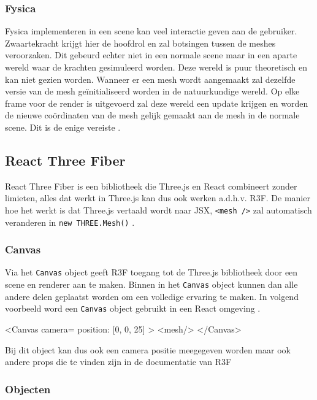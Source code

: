 \subsubsection{Fysica}

Fysica implementeren in een scene kan veel interactie geven aan de gebruiker. Zwaartekracht krijgt hier de hoofdrol en zal botsingen tussen de meshes veroorzaken. Dit gebeurd echter niet in een normale scene maar in een aparte wereld waar de krachten gesimuleerd worden. Deze wereld is puur theoretisch en kan niet gezien worden. Wanneer er een mesh wordt aangemaakt zal dezelfde versie van de mesh geïnitialiseerd worden in de natuurkundige wereld.
Op elke frame voor de render is uitgevoerd zal deze wereld een update krijgen en worden de nieuwe coördinaten van de mesh gelijk gemaakt aan de mesh in de normale scene. Dit is de enige vereiste \autocite{Simon2023}.

\subsection{React Three Fiber}

React Three Fiber is een bibliotheek die Three.js en React combineert zonder limieten, alles dat werkt in Three.js kan dus ook werken a.d.h.v. R3F. De manier hoe het werkt is dat Three.js vertaald wordt naar JSX, \texttt{<mesh />} zal automatisch veranderen in \texttt{new THREE.Mesh()} \autocite{reactThreeFiber2023}.

\subsubsection{Canvas}

Via het \texttt{Canvas} object geeft R3F toegang tot de Three.js bibliotheek door een scene en renderer aan te maken. Binnen in het  \texttt{Canvas} object kunnen dan alle andere delen geplaatst worden om een volledige ervaring te maken. In volgend voorbeeld word een  \texttt{Canvas} object gebruikt in een React omgeving \autocite{reactThreeFiber2023}.

\begin{LVerbatim}
<Canvas camera={{ position: [0, 0, 25] }} >
	<mesh/>
</Canvas>
\end{LVerbatim}

Bij dit object kan dus ook een camera positie meegegeven worden maar ook andere props die te vinden zijn in de documentatie van R3F

\subsubsection{Objecten}

